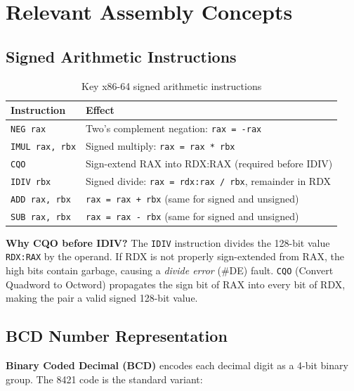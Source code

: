 \documentclass[12pt,a4paper]{article}
\newcommand{\code}[1]{\texttt{\small #1}}
\begin{document}
\newpage

\section{Relevant Assembly Concepts}

\subsection{Signed Arithmetic Instructions}

\begin{table}[H]
  \centering
  \caption{Key x86-64 signed arithmetic instructions}
  \renewcommand{\arraystretch}{1.3}
  \begin{tabular}{|l|l|}
    \hline
    \textbf{Instruction} & \textbf{Effect} \\
    \hline
    \code{NEG rax}           & Two's complement negation: \code{rax = -rax} \\
    \code{IMUL rax, rbx}     & Signed multiply: \code{rax = rax * rbx} \\
    \code{CQO}               & Sign-extend RAX into RDX:RAX (required before IDIV) \\
    \code{IDIV rbx}          & Signed divide: \code{rax = rdx:rax / rbx}, remainder in RDX \\
    \code{ADD rax, rbx}      & \code{rax = rax + rbx} (same for signed and unsigned) \\
    \code{SUB rax, rbx}      & \code{rax = rax - rbx} (same for signed and unsigned) \\
    \hline
  \end{tabular}
\end{table}

\noindent\textbf{Why CQO before IDIV?} The \code{IDIV} instruction divides the
128-bit value \code{RDX:RAX} by the operand. If RDX is not properly
sign-extended from RAX, the high bits contain garbage, causing a \emph{divide
error} (\#DE) fault. \code{CQO} (Convert Quadword to Octword) propagates the
sign bit of RAX into every bit of RDX, making the pair a valid signed 128-bit
value.

\subsection{BCD Number Representation}

\textbf{Binary Coded Decimal (BCD)} encodes each decimal digit as a 4-bit
binary group. The 8421 code is the standard variant:
\end{document}
